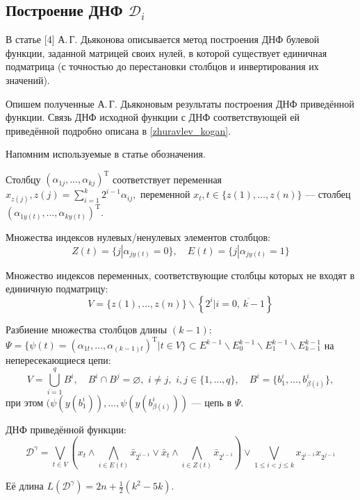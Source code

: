 \documentclass[12pt,a4paper,oneside,fleqn,leqno]{article}
\theoremstyle{definition}
\begin{document}
		\subsection{Построение ДНФ $\mathcal{D}_i$} \label{dj}
			В статье [4] А.\,Г. Дьяконова описывается метод построения ДНФ булевой функции, заданной матрицей своих нулей, в которой существует единичная подматрица (с точностью до перестановки столбцов и инвертирования их значений).\par
			Опишем полученные А.\,Г. Дьяконовым результаты построения ДНФ приведённой функции. Связь ДНФ исходной функции с ДНФ соответствующей ей приведённой подробно описана в \ref{zhuravlev_kogan}.\par
			Напомним используемые в статье обозначения.\par
			Столбцу $(\alpha_{1j}, \ldots, \alpha_{kj})^{\text{T}}$ соответствует переменная $x_{z(j)}, z(j) = \sum\limits_{i = 1}^k 2^{i - 1}\alpha_{ij},$ переменной $x_t, t\in \{z(1),\ldots,z(n)\}$ --- столбец $(\alpha_{1y(t)}, \ldots, \alpha_{ky(t)})^{\text{T}}.$\par
			Множества индексов нулевых/ненулевых элементов столбцов:
			$$
				Z(t) = \{j | \alpha_{jy(t)} = 0\},\quad E(t) = \{j | \alpha_{jy(t)} = 1\}
			$$\par
			Множество индексов переменных, соответствующие столбцы которых не входят в единичную подматрицу:
			$$
				V = \{z(1), \ldots, z(n)\} \backslash \left\{2^i | i = \overline{0,\,k - 1}\right\}
			$$\par
			Разбиение множества столбцов длины $(k - 1)$: $\Psi = \{\psi(t) = (\alpha_{1t}, \ldots, \alpha_{(k - 1) t})^{\text{T}} | t \in V\} \subset E^{k - 1}\backslash E^{k - 1}_0\backslash E^{k - 1}_1 \backslash E^{k - 1}_{k - 1}$ на непересекающиеся цепи:
			$$
				V = \bigcup_{i = 1}^qB^i,\quad B^i\cap B^j = \varnothing,\,\,i \neq j,\,\,i,j \in \{1,\ldots,q\},\quad B^i = \{b^i_1,\ldots, b^i_{\beta(i)} \},
			$$
			при этом $(\psi(y(b^i_1)), \ldots, \psi(y(b^i_{\beta(i)}))$ --- цепь в $\Psi.$\par
			ДНФ приведённой функции:
			$$
				\mathcal{D}^{\gamma} = \bigvee_{t  \in V} \left(x_t \wedge \bigwedge_{i \in E(t)} \bar{x}_{2^{i - 1}} \vee \bar{x}_t \wedge \bigwedge_{i \in Z(t)} \bar{x}_{2^{i - 1}}\right) \vee \bigvee_{1 \leqslant i < j \leqslant k} x_{2^{i - 1}} x_{2^{j - 1}}
			$$\par
			Её длина $L(\mathcal{D}^{\gamma}) = 2n + \frac{1}{2}(k^2 - 5k).$\par
			
\end{document}
